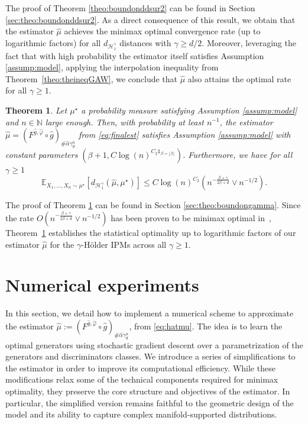 \documentclass[10pt]{article}
\newtheorem{theorem}{Theorem}
\begin{document}
The proof of Theorem \ref{theo:boundonddsur2} can be found in Section \ref{sec:theo:boundonddsur2}. As a direct consequence of this result, we obtain that the estimator \( \hat{\mu} \) achieves the minimax optimal convergence rate (up to logarithmic factors) for all \( d_{\mathcal{H}^{\gamma}_1} \) distances with \( \gamma \geq d/2 \). Moreover, leveraging the fact that with high probability the estimator itself satisfies Assumption \ref{assump:model}, applying the interpolation inequality from Theorem~\ref{theo:theineqGAW}, we conclude that \( \hat{\mu} \) also attains the optimal rate for all \( \gamma \geq 1 \).


\begin{theorem}\label{theo:boundongamma} Let $\mu^\star$ a probability measure satisfying Assumption \ref{assump:model} and $n\in \mathbb{N}$ large enough. Then, with probability at least $n^{-1}$, the  estimator $\hat{\mu}=(F^{\hat{g},\hat{\varphi}}\circ \hat{g})_{\# \hat{\alpha}\gamma_d^n}$ from \eqref{eq:finalest} satisfies Assumption \ref{assump:model} with constant parameters $(\beta+1,C\log(n)^{C_2\mathds{1}_{\beta=\lfloor \beta \rfloor}})$. Furthermore, we have for all $\gamma\geq 1$
   $$\mathbb{E}_{X_1,...,X_n\sim \mu^\star}[d_{\mathcal{H}^{\gamma}_1}(\hat{\mu},\mu^\star)]\leq C \log(n)^{C_2} \left(n^{-\frac{\beta+\gamma}{2\beta+d}}\vee n^{-1/2}\right).$$
\end{theorem}

The proof of Theorem \ref{theo:boundongamma} can be found in Section \ref{sec:theo:boundongamma}. Since the rate \( O\left(n^{-\frac{\beta+\gamma}{2\beta+d}} \vee n^{-1/2}\right) \) has been proven to be minimax optimal in~\cite{tang2023minimax}, Theorem~\ref{theo:boundongamma} establishes the statistical optimality up to logarithmic factors of our estimator \( \hat{\mu} \) for the \( \gamma \)-Hölder IPMs across all \( \gamma \geq 1 \).



\section{Numerical experiments}\label{sec:numeric}
In this section, we detail how to implement a numerical scheme to approximate the estimator $\hat{\mu}:=(F^{\hat{g},\hat{\varphi}}\circ \hat{g})_{\# \hat{\alpha}\gamma_d^n}$, from \eqref{eq:hatmu}. The idea is to learn the optimal generators using stochastic gradient descent over a parametrization of the generators and discriminators classes.
We introduce a series of simplifications to the estimator in order to improve its computational efficiency. While these modifications  relax some of the technical components required for minimax optimality, they preserve the core structure and objectives of the estimator. In particular, the simplified version remains faithful to the geometric design of the model and its ability to capture complex manifold-supported distributions.
\end{document}
